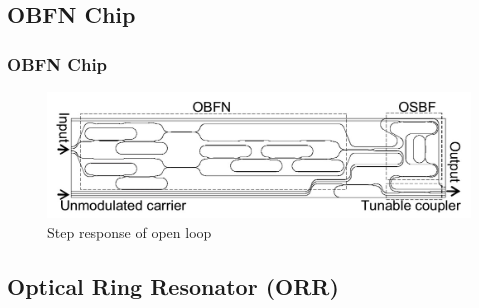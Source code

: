 \documentclass{beamer}
\begin{document}
\subsection{OBFN Chip}

\begin{frame}\frametitle{OBFN Chip}
		\begin{figure}
			\centering
			\includegraphics[width=0.8\linewidth]{images/OBFN_chip}
			\caption{Step response of open loop}
			\label{fig:bandwidth1}
		\end{figure}
\end{frame}

\subsection{Optical Ring Resonator (ORR)}
\end{document}
